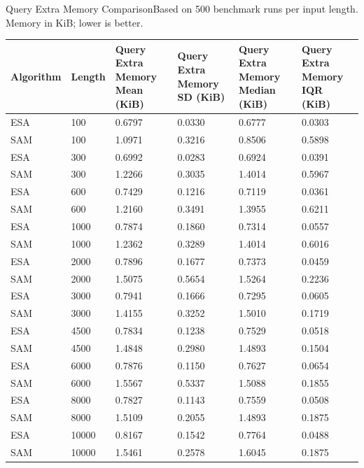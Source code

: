 \begin{benchmarktable}{Query Extra Memory Comparison}{Based on 500 benchmark runs per input length. Memory in KiB; lower is better.}
\begin{tabularx}{\textwidth}{|X|X|X|X|X|X|}
\toprule
Algorithm & Length & Query Extra Memory Mean (KiB) & Query Extra Memory SD (KiB) & Query Extra Memory Median (KiB) & Query Extra Memory IQR (KiB) \\
\midrule
ESA & 100 & 0.6797 & 0.0330 & 0.6777 & 0.0303 \\
SAM & 100 & 1.0971 & 0.3216 & 0.8506 & 0.5898 \\
\hline
ESA & 300 & 0.6992 & 0.0283 & 0.6924 & 0.0391 \\
SAM & 300 & 1.2266 & 0.3035 & 1.4014 & 0.5967 \\
\hline
ESA & 600 & 0.7429 & 0.1216 & 0.7119 & 0.0361 \\
SAM & 600 & 1.2160 & 0.3491 & 1.3955 & 0.6211 \\
\hline
ESA & 1000 & 0.7874 & 0.1860 & 0.7314 & 0.0557 \\
SAM & 1000 & 1.2362 & 0.3289 & 1.4014 & 0.6016 \\
\hline
ESA & 2000 & 0.7896 & 0.1677 & 0.7373 & 0.0459 \\
SAM & 2000 & 1.5075 & 0.5654 & 1.5264 & 0.2236 \\
\hline
ESA & 3000 & 0.7941 & 0.1666 & 0.7295 & 0.0605 \\
SAM & 3000 & 1.4155 & 0.3252 & 1.5010 & 0.1719 \\
\hline
ESA & 4500 & 0.7834 & 0.1238 & 0.7529 & 0.0518 \\
SAM & 4500 & 1.4848 & 0.2980 & 1.4893 & 0.1504 \\
\hline
ESA & 6000 & 0.7876 & 0.1150 & 0.7627 & 0.0654 \\
SAM & 6000 & 1.5567 & 0.5337 & 1.5088 & 0.1855 \\
\hline
ESA & 8000 & 0.7827 & 0.1143 & 0.7559 & 0.0508 \\
SAM & 8000 & 1.5109 & 0.2055 & 1.4893 & 0.1875 \\
\hline
ESA & 10000 & 0.8167 & 0.1542 & 0.7764 & 0.0488 \\
SAM & 10000 & 1.5461 & 0.2578 & 1.6045 & 0.1875 \\
\bottomrule
\end{tabularx}
\end{benchmarktable}

